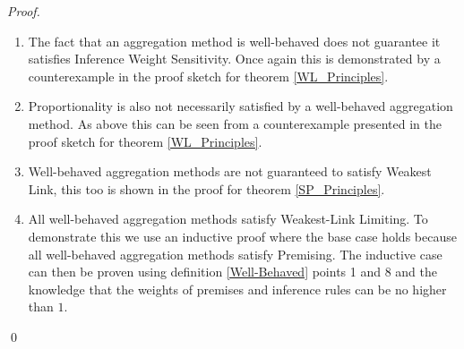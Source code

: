 \documentclass[runningheads]{llncs}
\begin{document}
\begin{proof}
\begin{enumerate}
    \item The fact that an aggregation method is well-behaved does not guarantee it satisfies Inference Weight Sensitivity. Once again this is demonstrated by a counterexample in the proof sketch for theorem \ref{WL_Principles}.
    \item Proportionality is also not necessarily satisfied by a well-behaved aggregation method. As above this can be seen from a counterexample presented in the proof sketch for theorem \ref{WL_Principles}.
    \item Well-behaved aggregation methods are not guaranteed to satisfy Weakest Link, this too is shown in the proof for theorem \ref{SP_Principles}.
    \item All well-behaved aggregation methods satisfy Weakest-Link Limiting. To demonstrate this we use an inductive proof where the base case holds because all well-behaved aggregation methods satisfy Premising. The inductive case can then be proven using definition \ref{Well-Behaved} points 1 and 8 and the knowledge that the weights of premises and inference rules can be no higher than $1$.
\end{enumerate}
\qed\end{proof}
%
\end{document}
